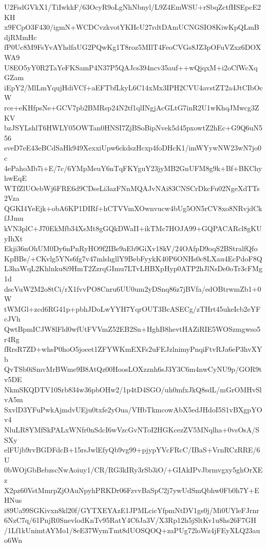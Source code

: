 U2FsdGVkX1/TiIwkkF/63OcyR9oLgNhNbnyl/L9Z4EmWSU+rSbqZctfHSEpcE2KH
x9FCpO3F430/igmN+WCDCvzkvotYKHcU27rdtDAmUCNGSIO8KiwKpQLmBdjRMmHc
fP0Uc8M9FsYvAYhdfaUG2PQwKg1T8roz5MIlT4FeoCVGs8JZ3pOFuVZxz6DOXWA9
U8EO5yY0R2TaYeFKSamP4N37P5QAJcs394ncv35auf++wQjqxM+i2oCfWcXqGZam
iEpY2/MlLmYqujHdiVCf+aEFTbfLkyL6C14xMx3IPH2CVU4avstZT2a4JtCIbOcW
rce+eKHfpsNe+GCV7pb2BMRsp24N2tf1qlINgjAcGLtG7inR2U1wKhqJMwcg3ZKV
bzJSYLshlT6HWLY05OWTan0HNSI7ZjBSoBipNvek5d45pxowtZ2hEc+G9Q6uN556
sveD7eE43eBCdSaHk949XexxiUpw6ckdszHcxp4foDHcK1/imWYywNW23wN7jo0c
4ePahoMb7i+E/7c/6YMpMeuY6nTqFKYguY23jyMB2GnUFM8g9k+Bf+BKChyhwEqE
WTfZlUOebWj6FRE6d9CDseLi3azFNnMQAJvNAi83CNSCrDkcFu02NgeXdTTs2Vza
QGKI4YeEjk+obA6KP1DIRf+hCTVVmXOwnvucw4bUg5ON5rCV8xo8NRvjdCkfJJmu
kVN3plC+J70EkMfb34XsMt8gGQkDWaII+ikTMc7HOJA99+GQPACARcl8gKUyIhXt
Ekji36nOhUM0Dy6nPnRyHO9f2IBe9aEb9GiXv18kV/24OAfpD9oqS2BStralfQfo
KpBBs/+CKvlg5YNs6fg7v47mlshgllY9BebFyykK40P6ONHs0c8LXau4EcPdoF8Q
L3haWqL2Khlnku8i9HmT2ZzrqGImu7LTvLHBXpHyp0ATP2hJlNsDe0oTr3cFMg1d
dscVuW2M2o8tCi/rX1fvvPO8Cnru6UU0um2yDSnq86z7jBVfa/edOBtrwmZb1+0W
tWMGl+zcd6RG41p+pbhJDoLwYYH7YqrOUT3BcASECg/zTHrt45ukeIcb2eYFcJVh
QwtBpmICJW8lFld0wfUtFVVmZ52EB2Sn+HghB8hevtHAZiRIE5WOSzmgwso5r4Rg
fRrsR7ZD+whsP0hoO5joeet1ZFYWKmEXFs2uFEJzlnimyPnqiFtvRJa6eP3hvXYb
QvTSb0iSmvMrBWme9B8AtQz00HoosLOXzznh6sJ3Y3C6m4nwCyNU9p/GOR9tv5DE
NkmSKQDTV10Srb834w36pbOHw2/1p4tD4SGO/uh0mfxJkQ8sdL/mGrOMHvSlvA5m
SxvlD3YFuPwkAjmdvUEju0txfe2yOua/VHbTkmcowAbX5edJHdoI5S1vBXgpYOv4
NluLR8YMfSkPALxWNfr0nSdcI6wVzcGvNToI2HGKcezZV5MNqlha+0vsOsA/SSXy
elFUjb9rvBGDFdcB+15rsJwlEfyQb9vg99+pjypYVcFRcC/IBaS+VrnRCzRRE/6U
0bWOjGbBebzscNwAoiuy1/CR/RG3kIRy3rSb3iO/+GIAkIPvJbrmvgxy5ghOrXEz
X2pz60VstMmrpZjOAuNpyhPRKDr06FzvvBaSpC2j7ywUdSmQbhw0Fb0h7Y+EHNus
i89Ua99SGKivxn8kl20f/GYTXEYAzE1JPMLcicYfpmNtDV1gs0j/Mi0UYleFJrnr
6NzC7q/61PnjR0SnevlodKnTv95RatY4C6Ja3V/X3Rp12h5jSltKv1u8hs26F7GH
/1Lf1kUnimtAYMo1/8eE37WymTmt8dUOSQOQ+zaPUg72loWz4jFEyXLQ23auo6Wn

